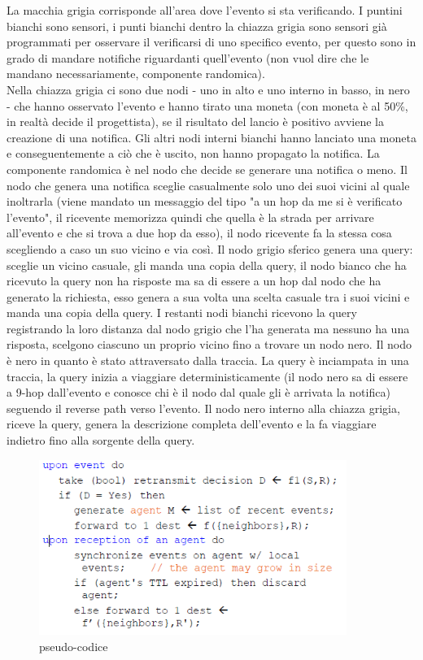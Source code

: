 \documentclass[12pt,italian]{report}
\begin{document}
\bigbreak
La macchia grigia corrisponde all'area dove l'evento si sta verificando. I puntini bianchi sono sensori, i punti bianchi dentro la chiazza grigia sono sensori già programmati per osservare il verificarsi di uno specifico evento, per questo sono in grado di mandare notifiche riguardanti quell'evento (non vuol dire che le mandano necessariamente, componente randomica). \\ Nella chiazza grigia ci sono due nodi - uno in alto e uno interno in basso, in nero - che hanno osservato l'evento e hanno tirato una moneta (con moneta è al 50\%, in realtà decide il progettista), se il risultato del lancio è positivo avviene la creazione di una notifica. Gli altri nodi interni bianchi hanno lanciato una moneta e conseguentemente a ciò che è uscito, non hanno propagato la notifica. La componente randomica è nel nodo che decide se generare una notifica o meno. 
\bigbreak
\noindent Il nodo che genera una notifica sceglie casualmente solo uno dei suoi vicini al quale inoltrarla (viene mandato un messaggio del tipo "a un hop da me si è verificato l'evento", il ricevente memorizza quindi che quella è la strada per arrivare all'evento e che si trova a due hop da esso), il nodo ricevente fa la stessa cosa scegliendo a caso un suo vicino e via così. 
\bigbreak
\noindent Il nodo grigio sferico genera una query: sceglie un vicino casuale, gli manda una copia della query, il nodo bianco che ha ricevuto la query non ha risposte ma sa di essere a un hop dal nodo che ha generato la richiesta, esso genera a sua volta una scelta casuale tra i suoi vicini e manda una copia della query. I restanti nodi bianchi ricevono la query registrando la loro distanza dal nodo grigio che l'ha generata ma nessuno ha una risposta, scelgono ciascuno un proprio vicino fino a trovare un nodo nero. Il nodo è nero in quanto è stato attraversato dalla traccia. 
\bigbreak
\noindent La query è inciampata in una traccia, la query inizia a viaggiare deterministicamente (il nodo nero sa di essere a 9-hop dall'evento e conosce chi è il nodo dal quale gli è arrivata la notifica) seguendo il reverse path verso l'evento. Il nodo nero interno alla chiazza grigia, riceve la query, genera la descrizione completa dell'evento e la fa viaggiare indietro fino alla sorgente della query. 
\begin{figure}[h]
\centering
\includegraphics[width=100mm]{img/pse.PNG}
\caption{pseudo-codice}
\label{fig:ps}
\end{figure}
\end{document}
